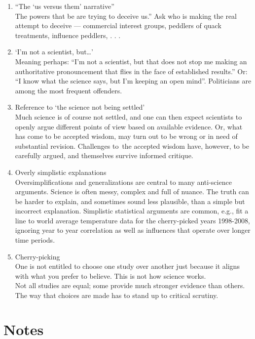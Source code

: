 \documentclass[
  10pt,
  b5paper]{book}
\providecommand{\tightlist}{%
  \setlength{\itemsep}{0pt}\setlength{\parskip}{0pt}}
\begin{document}
\begin{enumerate}
\def\labelenumi{\arabic{enumi}.}
\tightlist
\item
  ``The `us versus them' narrative''\\
  The powers that be are trying to deceive us.'' Ask who is
  making the real attempt to deceive --- commercial interest groups,
  peddlers of quack treatments, influence peddlers, . . .
\item
  `I'm not a scientist, but\ldots{}'\\
  Meaning perhaps: ``I'm not a scientist, but that does not stop me
  making an authoritative pronouncement that flies in the face of
  established results.'' Or: ``I know what the science says, but
  I'm keeping an open mind''. Politicians are among the most
  frequent offenders.
\item
  Reference to `the science not being settled'\\
  Much science is of course not settled, and one can then
  expect scientists to openly argue different points of view
  based on available evidence. Or, what has come to be accepted
  wisdom, may turn out to be wrong or in need of substantial
  revision. Challenges to~the accepted wisdom have, however, to be
  carefully argued, and themselves survive informed critique.
\item
  Overly simplistic explanations\\
  Oversimplifications and generalizations are central to many
  anti-science arguments. Science is often messy, complex and full
  of nuance. The truth can be harder to explain, and sometimes
  sound less plausible, than a simple but incorrect explanation.
  Simplistic statistical arguments are common, e.g., fit a
  line to world average temperature data for the cherry-picked years
  1998-2008, ignoring year to year correlation as well as influences
  that operate over longer time periods.
\item
  Cherry-picking\\
  One is not entitled to choose one study over another just because it aligns
  with what you prefer to believe. This is not how science works.\\
  Not all studies are equal; some provide much stronger evidence than others.
  The way that choices are made has to stand up to critical scrutiny.
\end{enumerate}

\hypertarget{notes}{%
\chapter{Notes}\label{notes}}
\end{document}
